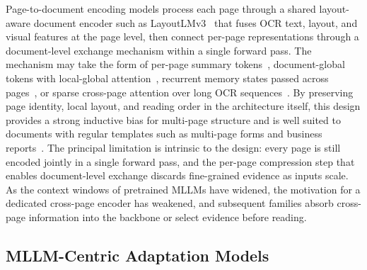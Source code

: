 \documentclass[11pt]{article}
\begin{document}
Page-to-document encoding models process each page through a shared layout-aware document encoder such as LayoutLMv3~\cite{huang2022layoutlmv3} that fuses OCR text, layout, and visual features at the page level, then connect per-page representations through a document-level exchange mechanism within a single forward pass. The mechanism may take the form of per-page summary tokens~\cite{tito2023hierarchical}, document-global tokens with local-global attention~\cite{blau2024gram}, recurrent memory states passed across pages~\cite{dong2024multipage}, or sparse cross-page attention over long OCR sequences~\cite{borchmann2025arctictilt}. By preserving page identity, local layout, and reading order in the architecture itself, this design provides a strong inductive bias for multi-page structure and is well suited to documents with regular templates such as multi-page forms and business reports~\cite{tito2023hierarchical,borchmann2025arctictilt}. The principal limitation is intrinsic to the design: every page is still encoded jointly in a single forward pass, and the per-page compression step that enables document-level exchange discards fine-grained evidence as inputs scale. As the context windows of pretrained MLLMs have widened, the motivation for a dedicated cross-page encoder has weakened, and subsequent families absorb cross-page information into the backbone or select evidence before reading.

\subsection{MLLM-Centric Adaptation Models}
\label{sec:arch-bc}
\end{document}
